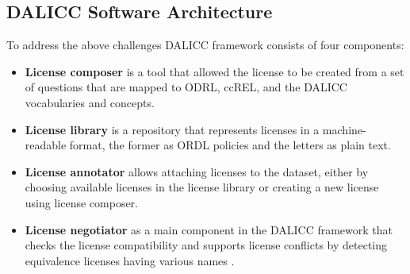 \subsection{DALICC Software Architecture}
To address the above challenges DALICC framework consists of four components:\\
\begin{itemize}
	\item \textbf{License composer} is a tool that allowed the license to be created from a set of questions that are mapped to ODRL, ccREL, and the DALICC vocabularies and concepts.
	\item \textbf{License library} is a repository that represents licenses in a machine-readable format, the former as ORDL policies and the letters as plain text.
	\item \textbf{License annotator} allows attaching licenses to the dataset, either by choosing available licenses in the license library or creating a new license using license composer.
	\item \textbf{License negotiator} as a main component in the DALICC framework that checks the license compatibility and supports license conflicts by detecting equivalence licenses having various names \cite{Anna}.
\end{itemize}
